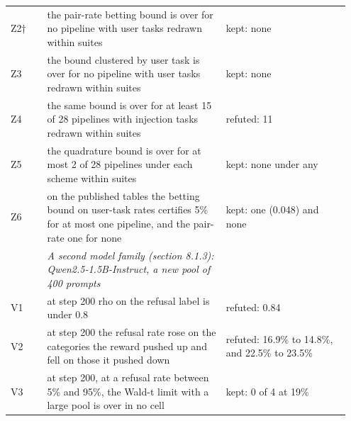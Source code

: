 \documentclass[11pt]{article}
\begin{document}
\begin{longtable}{@{}>{\raggedright\arraybackslash}p{0.101\linewidth}>{\raggedright\arraybackslash}p{0.499\linewidth}>{\raggedright\arraybackslash}p{0.346\linewidth}@{}}
\hspace{0pt}Z2† & \hspace{0pt}the pair-rate betting bound is over for no pipeline with user tasks redrawn within suites & \hspace{0pt}kept: none \\
\hspace{0pt}Z3 & \hspace{0pt}the bound clustered by user task is over for no pipeline with user tasks redrawn within suites & \hspace{0pt}kept: none \\
\hspace{0pt}Z4 & \hspace{0pt}the same bound is over for at least 15 of 28 pipelines with injection tasks redrawn within suites & \hspace{0pt}refuted: 11 \\
\hspace{0pt}Z5 & \hspace{0pt}the quadrature bound is over for at most 2 of 28 pipelines under each scheme within suites & \hspace{0pt}kept: none under any \\
\hspace{0pt}Z6 & \hspace{0pt}on the published tables the betting bound on user-task rates certifies 5\% for at most one pipeline, and the pair-rate one for none & \hspace{0pt}kept: one (0.048) and none \\
 & \hspace{0pt}\emph{A second model family (section 8.1.3): Qwen2.5-1.5B-Instruct, a new pool of 400 prompts} &  \\
\hspace{0pt}V1 & \hspace{0pt}at step 200 rho on the refusal label is under 0.8 & \hspace{0pt}refuted: 0.84 \\
\hspace{0pt}V2 & \hspace{0pt}at step 200 the refusal rate rose on the categories the reward pushed up and fell on those it pushed down & \hspace{0pt}refuted: 16.9\% to 14.8\%, and 22.5\% to 23.5\% \\
\hspace{0pt}V3 & \hspace{0pt}at step 200, at a refusal rate between 5\% and 95\%, the Wald-t limit with a large pool is over in no cell & \hspace{0pt}kept: 0 of 4 at 19\% \\

\end{longtable}
\end{document}
